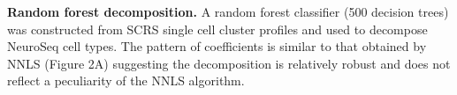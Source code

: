 \textbf{Random forest decomposition. }
A random forest classifier (500 decision trees) was constructed from SCRS single cell cluster profiles and used to decompose NeuroSeq cell types. The pattern of coefficients is similar to that obtained by NNLS (Figure 2A) suggesting the decomposition is relatively robust and does not reflect a peculiarity of the NNLS algorithm.
